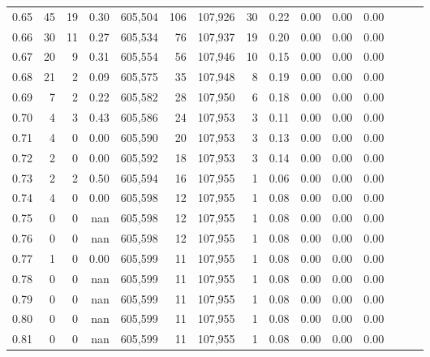 \begin{tabular}{rrrrrrrrrrrrrrr}
0.65 &       45 &      19 &  0.30 &  605,504 &      106 &  107,926 &       30 &  0.22 &  0.00 &  0.00 &      0.00 \\
0.66 &       30 &      11 &  0.27 &  605,534 &       76 &  107,937 &       19 &  0.20 &  0.00 &  0.00 &      0.00 \\
0.67 &       20 &       9 &  0.31 &  605,554 &       56 &  107,946 &       10 &  0.15 &  0.00 &  0.00 &      0.00 \\
0.68 &       21 &       2 &  0.09 &  605,575 &       35 &  107,948 &        8 &  0.19 &  0.00 &  0.00 &      0.00 \\
0.69 &        7 &       2 &  0.22 &  605,582 &       28 &  107,950 &        6 &  0.18 &  0.00 &  0.00 &      0.00 \\
0.70 &        4 &       3 &  0.43 &  605,586 &       24 &  107,953 &        3 &  0.11 &  0.00 &  0.00 &      0.00 \\
0.71 &        4 &       0 &  0.00 &  605,590 &       20 &  107,953 &        3 &  0.13 &  0.00 &  0.00 &      0.00 \\
0.72 &        2 &       0 &  0.00 &  605,592 &       18 &  107,953 &        3 &  0.14 &  0.00 &  0.00 &      0.00 \\
0.73 &        2 &       2 &  0.50 &  605,594 &       16 &  107,955 &        1 &  0.06 &  0.00 &  0.00 &      0.00 \\
0.74 &        4 &       0 &  0.00 &  605,598 &       12 &  107,955 &        1 &  0.08 &  0.00 &  0.00 &      0.00 \\
0.75 &        0 &       0 &   nan &  605,598 &       12 &  107,955 &        1 &  0.08 &  0.00 &  0.00 &      0.00 \\
0.76 &        0 &       0 &   nan &  605,598 &       12 &  107,955 &        1 &  0.08 &  0.00 &  0.00 &      0.00 \\
0.77 &        1 &       0 &  0.00 &  605,599 &       11 &  107,955 &        1 &  0.08 &  0.00 &  0.00 &      0.00 \\
0.78 &        0 &       0 &   nan &  605,599 &       11 &  107,955 &        1 &  0.08 &  0.00 &  0.00 &      0.00 \\
0.79 &        0 &       0 &   nan &  605,599 &       11 &  107,955 &        1 &  0.08 &  0.00 &  0.00 &      0.00 \\
0.80 &        0 &       0 &   nan &  605,599 &       11 &  107,955 &        1 &  0.08 &  0.00 &  0.00 &      0.00 \\
0.81 &        0 &       0 &   nan &  605,599 &       11 &  107,955 &        1 &  0.08 &  0.00 &  0.00 &      0.00 \\

\end{tabular}
